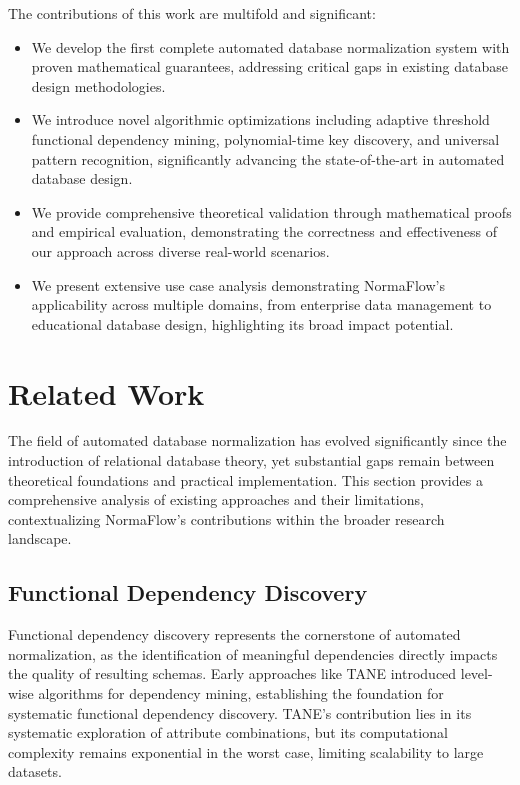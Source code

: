 \documentclass[acmsmall]{acmart}
\begin{document}
The contributions of this work are multifold and significant:

\begin{itemize}
\item We develop the first complete automated database normalization system with proven mathematical guarantees, addressing critical gaps in existing database design methodologies.
\item We introduce novel algorithmic optimizations including adaptive threshold functional dependency mining, polynomial-time key discovery, and universal pattern recognition, significantly advancing the state-of-the-art in automated database design.
\item We provide comprehensive theoretical validation through mathematical proofs and empirical evaluation, demonstrating the correctness and effectiveness of our approach across diverse real-world scenarios.
\item We present extensive use case analysis demonstrating NormaFlow's applicability across multiple domains, from enterprise data management to educational database design, highlighting its broad impact potential.
\end{itemize}

\section{Related Work}

The field of automated database normalization has evolved significantly since the introduction of relational database theory, yet substantial gaps remain between theoretical foundations and practical implementation. This section provides a comprehensive analysis of existing approaches and their limitations, contextualizing NormaFlow's contributions within the broader research landscape.

\subsection{Functional Dependency Discovery}

Functional dependency discovery represents the cornerstone of automated normalization, as the identification of meaningful dependencies directly impacts the quality of resulting schemas. Early approaches like TANE \cite{tane2001} introduced level-wise algorithms for dependency mining, establishing the foundation for systematic functional dependency discovery. TANE's contribution lies in its systematic exploration of attribute combinations, but its computational complexity remains exponential in the worst case, limiting scalability to large datasets.
\end{document}
